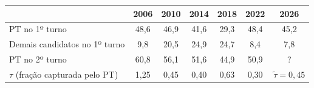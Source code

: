 \begin{tabular}{lcccccc}
\toprule
 & 2006 & 2010 & 2014 & 2018 & 2022 & \textbf{2026} \\
\midrule
PT no 1º turno & 48,6 & 46,9 & 41,6 & 29,3 & 48,4 & 45,2 \\
Demais candidatos no 1º turno & 9,8 & 20,5 & 24,9 & 24,7 & 8,4 & 7,8 \\
PT no 2º turno & 60,8 & 56,1 & 51,6 & 44,9 & 50,9 & ? \\
$\tau$ (fração capturada pelo PT) & 1,25 & 0,45 & 0,40 & 0,63 & 0,30 & $\tilde\tau=0,45$ \\
\bottomrule
\end{tabular}
